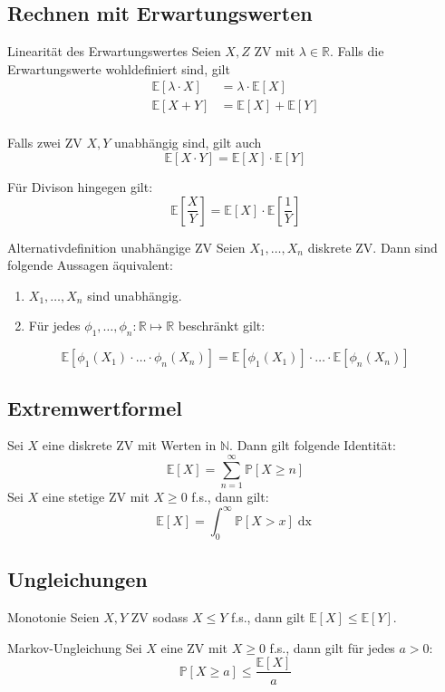 \documentclass[a4paper,10pt]{article}
\def\R{\mathbb{R}}
\def\P{\mathbb{P}}
\def\E{\mathbb{E}}
\begin{document}
\subsection{Rechnen mit Erwartungswerten}
\begin{subbox}{Linearität des Erwartungswertes}
	Seien \(X,Z\) ZV mit \(\lambda \in \R\). Falls die Erwartungswerte wohldefiniert sind, gilt
	\begin{align*}
		\E[\lambda \cdot X] & = \lambda \cdot \E[X] \\
		\E[X + Y]           & = \E[X] + \E[Y]       \\
	\end{align*}
\end{subbox}
Falls zwei ZV \(X,Y\) unabhängig sind, gilt auch
\[\E[X\cdot Y] = \E[X] \cdot \E[Y]\]

Für Divison hingegen gilt:
\[\E[\frac{X}{Y}] = \E[X] \cdot \E[\frac{1}{Y}]\]

\begin{subbox}{Alternativdefinition unabhängige ZV}
	Seien \(X_1, \ldots, X_n\) diskrete ZV. Dann sind folgende Aussagen äquivalent:
	\begin{enumerate}
		\item \(X_1, \ldots, X_n\) sind unabhängig.
		\item Für jedes \(\phi_1, \ldots, \phi_n: \R \mapsto\R\) beschränkt gilt:
	\end{enumerate}
	\[\E[\phi_1(X_1)\cdot\ldots\cdot\phi_n(X_n)] = \E[\phi_1(X_1)] \cdot\ldots\cdot \E[\phi_n(X_n)]\]
\end{subbox}

\subsection{Extremwertformel}
Sei \(X\) eine diskrete ZV mit Werten in \(\mathbb{N}\). Dann gilt folgende Identität:
\[\E[X] = \sum_{n=1}^\infty \P[X\ge n]\]
Sei \(X\) eine stetige ZV mit \(X \ge 0\) f.s., dann gilt:
\[\E[X] = \int_0^\infty \P[X > x] \mathop{dx}\]

\subsection{Ungleichungen}
\begin{subbox}{Monotonie}
	Seien \(X, Y\) ZV sodass \(X \le Y\) f.s., dann gilt \(\E[X] \le \E[Y]\).
\end{subbox}

\begin{mainbox}{Markov-Ungleichung}
	Sei \(X\) eine ZV mit \(X \ge 0\) f.s., dann gilt für jedes \(a > 0\):
	\[\P[X\ge a] \le \frac{\E[X]}{a}\]
\end{mainbox}
\end{document}
